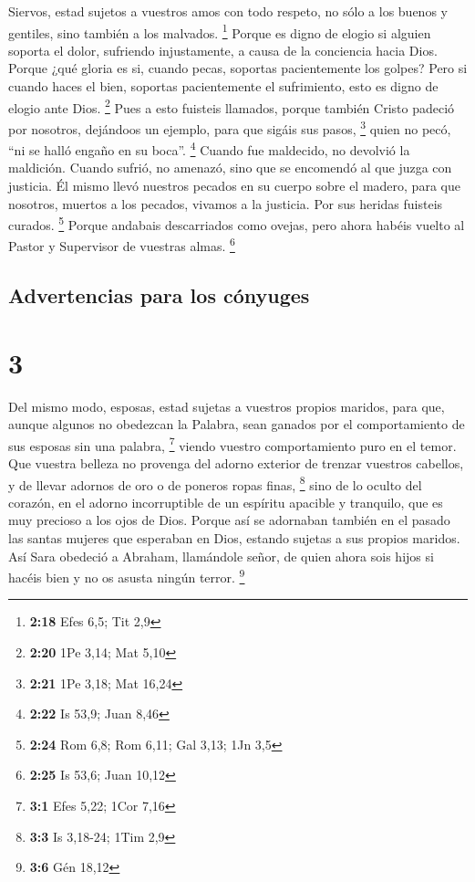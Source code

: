  Siervos, estad sujetos a vuestros amos con todo respeto,
no sólo a los buenos y gentiles, sino también a los malvados.
\footnote{\textbf{2:18} Efes 6,5; Tit 2,9}  Porque es
digno de elogio si alguien soporta el dolor, sufriendo injustamente, a
causa de la conciencia hacia Dios.  Porque ¿qué gloria es
si, cuando pecas, soportas pacientemente los golpes? Pero si cuando
haces el bien, soportas pacientemente el sufrimiento, esto es digno de
elogio ante Dios. \footnote{\textbf{2:20} 1Pe 3,14; Mat 5,10}
 Pues a esto fuisteis llamados, porque también Cristo
padeció por nosotros, dejándoos un ejemplo, para que sigáis sus pasos,
\footnote{\textbf{2:21} 1Pe 3,18; Mat 16,24}  quien no
pecó, ``ni se halló engaño en su boca''. \footnote{\textbf{2:22} Is
  53,9; Juan 8,46}  Cuando fue maldecido, no devolvió la
maldición. Cuando sufrió, no amenazó, sino que se encomendó al que juzga
con justicia.  Él mismo llevó nuestros pecados en su
cuerpo sobre el madero, para que nosotros, muertos a los pecados,
vivamos a la justicia. Por sus heridas fuisteis curados. \footnote{\textbf{2:24}
  Rom 6,8; Rom 6,11; Gal 3,13; 1Jn 3,5}  Porque andabais
descarriados como ovejas, pero ahora habéis vuelto al Pastor y
Supervisor de vuestras almas. \footnote{\textbf{2:25} Is 53,6; Juan
  10,12}

\hypertarget{advertencias-para-los-cuxf3nyuges}{%
\subsection{Advertencias para los
cónyuges}\label{advertencias-para-los-cuxf3nyuges}}

\hypertarget{section-2}{%
\section{3}\label{section-2}}

 Del mismo modo, esposas, estad sujetas a vuestros propios
maridos, para que, aunque algunos no obedezcan la Palabra, sean ganados
por el comportamiento de sus esposas sin una palabra, \footnote{\textbf{3:1}
  Efes 5,22; 1Cor 7,16}  viendo vuestro comportamiento
puro en el temor.  Que vuestra belleza no provenga del
adorno exterior de trenzar vuestros cabellos, y de llevar adornos de oro
o de poneros ropas finas, \footnote{\textbf{3:3} Is 3,18-24; 1Tim 2,9}
 sino de lo oculto del corazón, en el adorno incorruptible
de un espíritu apacible y tranquilo, que es muy precioso a los ojos de
Dios.  Porque así se adornaban también en el pasado las
santas mujeres que esperaban en Dios, estando sujetas a sus propios
maridos.  Así Sara obedeció a Abraham, llamándole señor,
de quien ahora sois hijos si hacéis bien y no os asusta ningún terror.
\footnote{\textbf{3:6} Gén 18,12}

